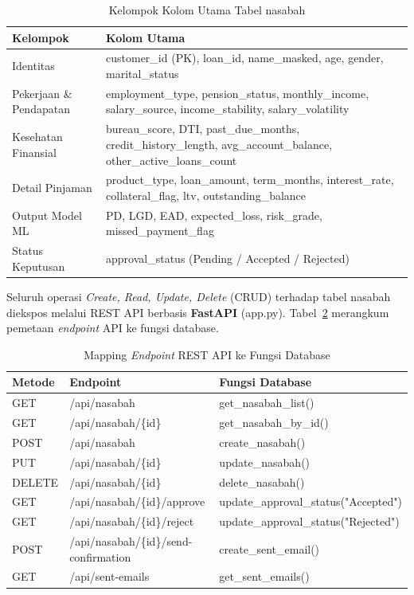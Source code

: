 \begin{table}[H]
\centering
\caption{Kelompok Kolom Utama Tabel nasabah}
\label{tab:db-cols}
\begin{tabularx}{\textwidth}{|p{3.5cm}|X|}
\hline
\textbf{Kelompok} & \textbf{Kolom Utama} \\ \hline
Identitas & customer\_id (PK), loan\_id, name\_masked, age, gender, marital\_status \\ \hline
Pekerjaan \& Pendapatan & employment\_type, pension\_status, monthly\_income, salary\_source, income\_stability, salary\_volatility \\ \hline
Kesehatan Finansial & bureau\_score, DTI, past\_due\_months, credit\_history\_length, avg\_account\_balance, other\_active\_loans\_count \\ \hline
Detail Pinjaman & product\_type, loan\_amount, term\_months, interest\_rate, collateral\_flag, ltv, outstanding\_balance \\ \hline
Output Model ML & PD, LGD, EAD, expected\_loss, risk\_grade, missed\_payment\_flag \\ \hline
Status Keputusan & approval\_status (Pending / Accepted / Rejected) \\ \hline
\end{tabularx}
\end{table}

Seluruh operasi \textit{Create, Read, Update, Delete} (CRUD) terhadap tabel nasabah diekspos melalui REST API berbasis \textbf{FastAPI} (app.py). Tabel~\ref{tab:crud-bab3} merangkum pemetaan \textit{endpoint} API ke fungsi database.

\begin{table}[H]
\centering
\caption{Mapping \textit{Endpoint} REST API ke Fungsi Database}
\label{tab:crud-bab3}
\begin{tabularx}{\textwidth}{|l|X|l|}
\hline
\textbf{Metode} & \textbf{Endpoint} & \textbf{Fungsi Database} \\ \hline
GET    & /api/nasabah                          & get\_nasabah\_list() \\ \hline
GET    & /api/nasabah/\{id\}                   & get\_nasabah\_by\_id() \\ \hline
POST   & /api/nasabah                          & create\_nasabah() \\ \hline
PUT    & /api/nasabah/\{id\}                   & update\_nasabah() \\ \hline
DELETE & /api/nasabah/\{id\}                   & delete\_nasabah() \\ \hline
GET    & /api/nasabah/\{id\}/\allowbreak approve           & update\_approval\_status("Accepted") \\ \hline
GET    & /api/nasabah/\{id\}/\allowbreak reject            & update\_approval\_status("Rejected") \\ \hline
POST   & /api/nasabah/\{id\}/\allowbreak send-confirmation & create\_sent\_email() \\ \hline
GET    & /api/sent-emails                      & get\_sent\_emails() \\ \hline
\end{tabularx}
\end{table}

